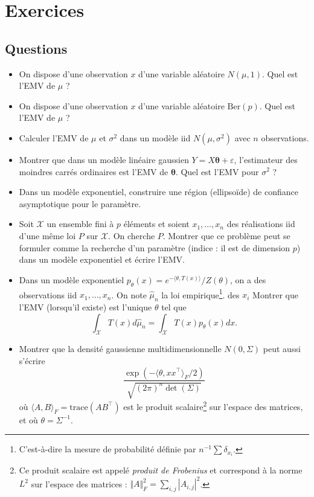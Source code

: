 \documentclass[
  10,
  letterpaper,
  DIV=11,
  numbers=noendperiod]{scrreport}
\providecommand{\tightlist}{%
  \setlength{\itemsep}{0pt}\setlength{\parskip}{0pt}}\usepackage{longtable,booktabs,array}
\newcommand{\bt}{\boldsymbol{\theta}}
\theoremstyle{plain}
\theoremstyle{definition}
\theoremstyle{plain}
\theoremstyle{definition}
\theoremstyle{definition}
\theoremstyle{plain}
\theoremstyle{remark}
\begin{document}

\hypertarget{exercices-8}{%
\chapter*{Exercices}\label{exercices-8}}


\hypertarget{questions-4}{%
\section*{Questions}\label{questions-4}}


\begin{itemize}
\tightlist
\item
  On dispose d'une observation \(x\) d'une variable aléatoire
  \(N(\mu, 1)\). Quel est l'EMV de \(\mu\) ?
\item
  On dispose d'une observation \(x\) d'une variable aléatoire
  \(\mathrm{Ber}(p)\). Quel est l'EMV de \(\mu\) ?
\item
  Calculer l'EMV de \(\mu\) et \(\sigma^2\) dans un modèle iid
  \(N(\mu, \sigma^2)\) avec \(n\) observations.
\item
  Montrer que dans un modèle linéaire gaussien
  \(Y = X\bt + \varepsilon\), l'estimateur des moindres carrés
  ordinaires est l'EMV de \(\bt\). Quel est l'EMV pour \(\sigma^2\) ?
\item
  Dans un modèle exponentiel, construire une région (ellipsoïde) de
  confiance asymptotique pour le paramètre.
\item
  Soit \(\mathcal{X}\) un ensemble fini à \(p\) éléments et soient
  \(x_1, \dotsc, x_n\) des réalisations iid d'une même loi \(P\) sur
  \(\mathcal{X}\). On cherche \(P\). Montrer que ce problème peut se
  formuler comme la recherche d'un paramètre (indice : il est de
  dimension \(p\)) dans un modèle exponentiel et écrire l'EMV.
\item
  Dans un modèle exponentiel
  \(p_\theta(x) = e^{-\langle \theta, T(x)\rangle}/Z(\theta)\), on a des
  observations iid \(x_1, \dotsc, x_n\). On note \(\hat{\mu}_n\) la loi
  empirique\footnote{C'est-à-dire la mesure de probabilité définie par
    \(n^{-1}\sum \delta_{x_i}\).}. des \(x_i\) Montrer que l'EMV
  (lorsqu'il existe) est l'unique \(\theta\) tel que
  \[ \int_{\mathcal{X}} T(x)d\hat{\mu}_n =  \int_{\mathcal{X}} T(x)p_\theta(x)dx.\]
\item
  Montrer que la densité gaussienne multidimensionnelle \(N(0,\Sigma)\)
  peut aussi s'écrire
  \[ \frac{\exp\left( - \langle \theta, xx^\top \rangle_F / 2 \right)}{\sqrt{(2\pi)^n \det(\Sigma)}}\]
  où \(\langle A,B\rangle_F = \mathrm{trace}(AB^\top)\) est le produit
  scalaire\footnote{Ce produit scalaire est appelé \emph{produit de
    Frobenius} et correspond à la norme \(L^2\) sur l'espace des
    matrices : \(\Vert A \Vert_F^2 = \sum_{i,j}|A_{i,j}|^2\).} sur
  l'espace des matrices, et où \(\theta = \Sigma^{-1}\).
\end{itemize}
\end{document}
